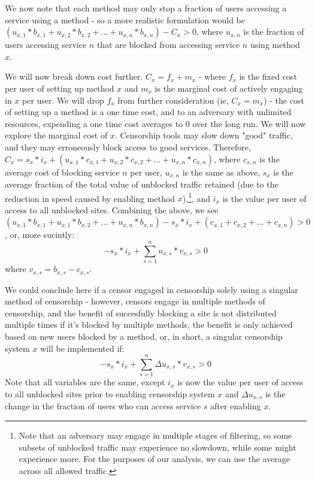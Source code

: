 \documentclass[12pt]{report}
\begin{document}
We now note that each method may only stop a fraction of users accessing a service using a method - so a more realistic formulation would be $(u_{x,1}*b_{x,1} + u_{x,2}*b_{x,2} + ... + u_{x,n}*b_{x,n}) - C_x > 0$, where $u_{x,n}$ is the fraction of users accessing service $n$ that are blocked from accessing service $n$ using method $x$.

We will now break down cost further. $C_x = f_x + m_x$ - where $f_x$ is the fixed cost per user of setting up method $x$ and $m_x$ is the marginal cost of actively engaging in $x$ per user. We will drop $f_x$ from further consideration (ie, $C_x = m_x$) - the cost of setting up a method is a one time cost, and to an adversary with unlimited resources, expending a one time cost averages to $0$ over the long run. We will now explore the marginal cost of $x$. Censorship tools may slow down "good" traffic, and they may erroneously block access to good services. Therefore, $C_x = s_x*i_x + (u_{x,1}*c_{x,1} + u_{x,2}*c_{x,2} + ...  + u_{x,n}*c_{x,n})$, where $c_{x,n}$ is the average cost of blocking service $n$ per user, $u_{x,n}$ is the same as above, $s_x$ is the average fraction of the total value of unblocked traffic retained (due to the reduction in speed caused by enabling method $x$),\footnote{Note that an adversary may engage in multiple stages of filtering, so some subsets of unblocked traffic may experience no slowdown, while some might experience more. For the purposes of our analysis, we can use the average across all allowed traffic.}, and $i_x$ is the value per user of access to all unblocked sites. Combining the above, we see
$(u_{x,1}*b_{x,1} + u_{x,1}*b_{x,2} + ... + u_{x,n}*b_{x,n}) - s_x*i_x + (c_{x,1} + c_{x,2} + ...  + c_{x,n}) > 0$, or, more sucintly:
\begin{equation}
-s_x*i_x + \sum_{s=1}^{n}u_{x,s}*v_{x,s} > 0
\end{equation}
where $v_{x,s} = b_{x,s} - c_{x,s}$.

We could conclude here if a censor engaged in censorship solely using a singular method of censorship - however, censors engage in multiple methods of censorship, and the benefit of succesfully blocking a site is not distributed multiple times if it's blocked by multiple methods, the benefit is only achieved based on new users blocked by a method, or, in short, a singular censorship system $x$ will be implemented if:
\begin{equation}
-s_x*i_x + \sum_{s=1}^{n}\Delta u_{x,s}*v_{x,s} > 0
\end{equation}
Note that all variables are the same, except $i_x$ is now the value per user of access to all unblocked sites prior to enabling censorship system $x$ and $\Delta u_{x,s}$ is the change in the fraction of users who can access service $s$ after enabling $x$.
\end{document}
